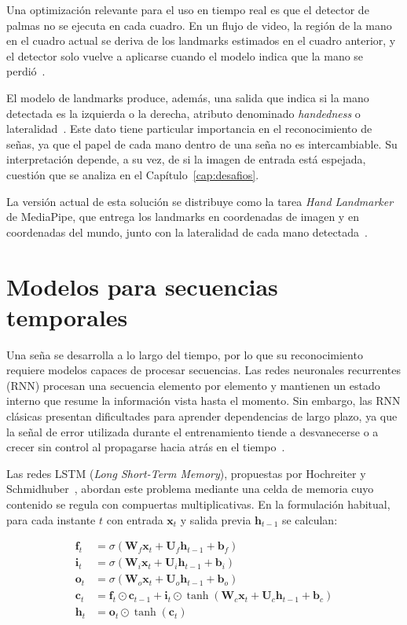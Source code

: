 Una optimización relevante para el uso en tiempo real es que el detector de palmas no se ejecuta en cada cuadro. En un flujo de video, la región de la mano en el cuadro actual se deriva de los landmarks estimados en el cuadro anterior, y el detector solo vuelve a aplicarse cuando el modelo indica que la mano se perdió~\cite{zhang2020mediapipehands}.

El modelo de landmarks produce, además, una salida que indica si la mano detectada es la izquierda o la derecha, atributo denominado \emph{handedness} o lateralidad~\cite{zhang2020mediapipehands}. Este dato tiene particular importancia en el reconocimiento de señas, ya que el papel de cada mano dentro de una seña no es intercambiable. Su interpretación depende, a su vez, de si la imagen de entrada está espejada, cuestión que se analiza en el Capítulo~\ref{cap:desafios}.

La versión actual de esta solución se distribuye como la tarea \emph{Hand Landmarker} de MediaPipe, que entrega los landmarks en coordenadas de imagen y en coordenadas del mundo, junto con la lateralidad de cada mano detectada~\cite{mediapipeHands}.

\section{Modelos para secuencias temporales}

Una seña se desarrolla a lo largo del tiempo, por lo que su reconocimiento requiere modelos capaces de procesar secuencias. Las redes neuronales recurrentes (RNN) procesan una secuencia elemento por elemento y mantienen un estado interno que resume la información vista hasta el momento. Sin embargo, las RNN clásicas presentan dificultades para aprender dependencias de largo plazo, ya que la señal de error utilizada durante el entrenamiento tiende a desvanecerse o a crecer sin control al propagarse hacia atrás en el tiempo~\cite{hochreiter1997lstm}.

Las redes LSTM (\emph{Long Short-Term Memory}), propuestas por Hochreiter y Schmidhuber~\cite{hochreiter1997lstm}, abordan este problema mediante una celda de memoria cuyo contenido se regula con compuertas multiplicativas. En la formulación habitual, para cada instante $t$ con entrada $\mathbf{x}_t$ y salida previa $\mathbf{h}_{t-1}$ se calculan:

\begin{align}
    \mathbf{f}_t &= \sigma(\mathbf{W}_f \mathbf{x}_t + \mathbf{U}_f \mathbf{h}_{t-1} + \mathbf{b}_f) \\
    \mathbf{i}_t &= \sigma(\mathbf{W}_i \mathbf{x}_t + \mathbf{U}_i \mathbf{h}_{t-1} + \mathbf{b}_i) \\
    \mathbf{o}_t &= \sigma(\mathbf{W}_o \mathbf{x}_t + \mathbf{U}_o \mathbf{h}_{t-1} + \mathbf{b}_o) \\
    \mathbf{c}_t &= \mathbf{f}_t \odot \mathbf{c}_{t-1} + \mathbf{i}_t \odot \tanh(\mathbf{W}_c \mathbf{x}_t + \mathbf{U}_c \mathbf{h}_{t-1} + \mathbf{b}_c) \\
    \mathbf{h}_t &= \mathbf{o}_t \odot \tanh(\mathbf{c}_t)
\end{align}

